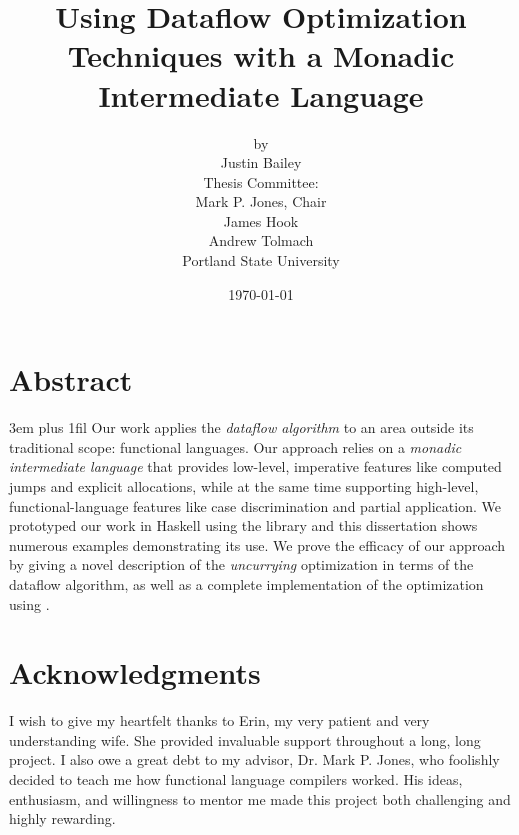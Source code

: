 \dodocclass



\date{\today}
\author{by \\ Justin Bailey \\[24pt] 
               {\normalsize Thesis Committee:} \\
               Mark P. Jones, Chair\\
               James Hook\\
               Andrew Tolmach \\[48pt] 
               Portland State University}
\title{Using Dataflow Optimization Techniques with a Monadic Intermediate Language}
\maketitle 

\pagestyle{plain}
\section*{Abstract}
{%
\parfillskip 3em plus 1fil%
Our work applies the \emph{dataflow algorithm} to an area outside its
traditional scope: functional languages. Our approach relies on
a \emph{monadic intermediate language} that provides low-level,
imperative features like computed jumps and explicit allocations,
while at the same time supporting high-level, functional-language
features like case discrimination and partial application. We
prototyped our work in Haskell using the \hoopl library and this
dissertation shows numerous examples demonstrating its use. We prove
the efficacy of our approach by giving a novel description of
the \emph{uncurrying} optimization in terms of the dataflow algorithm, as
well as a complete implementation of the optimization using \hoopl.\par}
\newpage

\section*{Acknowledgments}
I wish to give my heartfelt thanks to Erin, my very patient and very understanding
wife. She provided invaluable support throughout a long, long
project. I also owe a great debt to my advisor, Dr. Mark P. Jones, who
foolishly decided to teach me how functional language compilers
worked. His ideas, enthusiasm, and willingness to mentor me made this
project both challenging and highly rewarding. 

